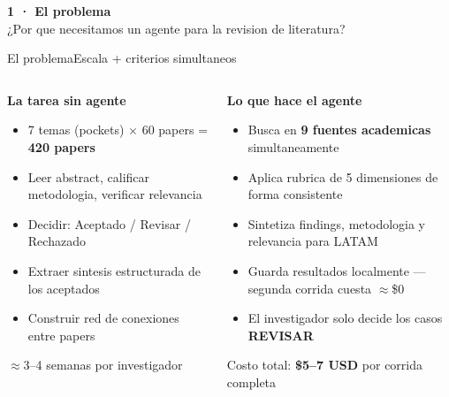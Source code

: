 \documentclass[aspectratio=169,10pt]{beamer}
\newcommand{\hl}[1]{\textcolor{bidaccent}{\textbf{#1}}}
\newenvironment{card}[1][cardbg]{%
  \begin{tcolorbox}[colback=#1,colframe=bidlight!40,arc=4pt,
    boxrule=0.4pt,left=5pt,right=5pt,top=4pt,bottom=4pt]}%
  {\end{tcolorbox}}
\begin{document}
{
\begin{frame}[plain]\vspace{20mm}
\begin{center}
{\Large\bfseries\color{bidaccent}1 · El problema}\\[5pt]
{\color{bidgray}\normalsize ¿Por que necesitamos un agente para la revision de literatura?}
\end{center}
\end{frame}
}

\begin{frame}{El problema}{Escala + criterios simultaneos}
\begin{columns}[T]
\begin{card}
\textbf{\color{bidaccent}La tarea sin agente}\\[3pt]
\scriptsize\color{bidgray}
\begin{itemize}\setlength\itemsep{2pt}
  \item 7 temas (pockets) $\times$ 60 papers = \hl{420 papers}
  \item Leer abstract, calificar metodologia, verificar relevancia
  \item Decidir: Aceptado / Revisar / Rechazado
  \item Extraer sintesis estructurada de los aceptados
  \item Construir red de conexiones entre papers
\end{itemize}
\vspace{2pt}
\textcolor{bidaccent!60}{\footnotesize $\approx$3--4 semanas por investigador}
\end{card}

\begin{card}
\textbf{\color{bidaccent}Lo que hace el agente}\\[3pt]
\scriptsize\color{bidgray}
\begin{itemize}\setlength\itemsep{2pt}
  \item Busca en \hl{9 fuentes academicas} simultaneamente
  \item Aplica rubrica de 5 dimensiones de forma consistente
  \item Sintetiza findings, metodologia y relevancia para LATAM
  \item Guarda resultados localmente --- segunda corrida cuesta $\approx$\$0
  \item El investigador solo decide los casos \textbf{REVISAR}
\end{itemize}
\vspace{2pt}
\textcolor{bidaccent!60}{\footnotesize Costo total: \textbf{\$5--7 USD} por corrida completa}
\end{card}
\end{columns}


\end{frame}
\end{document}
